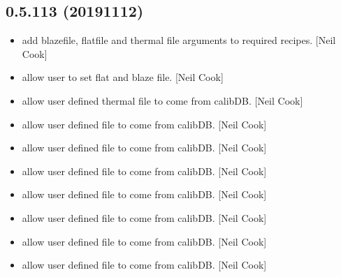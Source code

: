 \documentclass[a4paper,10pt,english]{report}
\begin{document}
\subsection{0.5.113 (2019\sphinxhyphen{}11\sphinxhyphen{}12)}
\label{\detokenize{misc/changelog:id48}}\begin{itemize}
\item {} 
 \sphinxhyphen{} add blazefile, flatfile
and thermal file arguments to required recipes. {[}Neil Cook{]}

\item {} 
 \sphinxhyphen{} allow user to set flat and blaze file.
{[}Neil Cook{]}

\item {} 
 \sphinxhyphen{} allow user defined thermal file to come from
calibDB. {[}Neil Cook{]}

\item {} 
 \sphinxhyphen{} allow user defined file to come from calibDB. {[}Neil
Cook{]}

\item {} 
 \sphinxhyphen{} allow user defined file to come from calibDB. {[}Neil
Cook{]}

\item {} 
 \sphinxhyphen{} allow user defined file to come from calibDB. {[}Neil
Cook{]}

\item {} 
 \sphinxhyphen{} allow user defined file to come from calibDB.
{[}Neil Cook{]}

\item {} 
 \sphinxhyphen{} allow user defined file to come from calibDB. {[}Neil
Cook{]}

\item {} 
 \sphinxhyphen{} allow user defined file to come from calibDB. {[}Neil
Cook{]}

\item {} 
 \sphinxhyphen{} allow user defined file to come from calibDB.
{[}Neil Cook{]}

\end{itemize}
\end{document}
